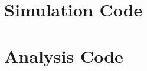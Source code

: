 \documentclass[12pt]{article}
\begin{document}
 


\appendix

\section{Simulation Code}


\section{Analysis Code}

\end{document}
